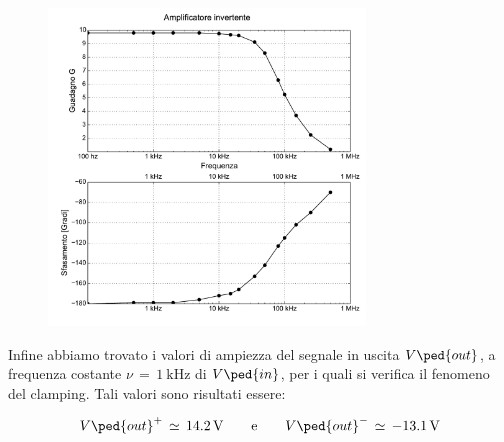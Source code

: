 \begin{figure}
    \includegraphics[width=0.75\textwidth]{amp_inv.pdf}
\end{figure}

Infine abbiamo trovato i valori di ampiezza del segnale in uscita $V\ped{out}$, a frequenza costante $\nu\,=\,\SI{1}{\kilo\hertz}$ di $V\ped{in}$, per i quali si verifica il fenomeno del clamping. Tali valori sono risultati essere:

\begin{equation}
        V\ped{out}^+\,\simeq\,\SI{14.2}{\volt} \qquad \text{e} \qquad V\ped{out}^-\,\simeq\,\SI{-13.1}{\volt}
\end{equation}



